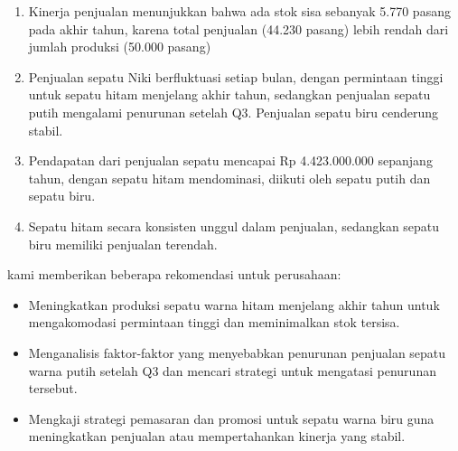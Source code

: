 \documentclass[letterpaper,11pt]{article}
\begin{document}
  \begin{enumerate}
      \item Kinerja penjualan menunjukkan bahwa ada stok sisa sebanyak 5.770 pasang pada akhir tahun, karena total penjualan (44.230 pasang) lebih rendah dari jumlah produksi (50.000 pasang)
      \item Penjualan sepatu Niki berfluktuasi setiap bulan, dengan permintaan tinggi untuk sepatu hitam menjelang akhir tahun, sedangkan penjualan sepatu putih mengalami penurunan setelah Q3. Penjualan sepatu biru cenderung stabil.
      \item Pendapatan dari penjualan sepatu mencapai Rp 4.423.000.000 sepanjang tahun, dengan sepatu hitam mendominasi, diikuti oleh sepatu putih dan sepatu biru.
      \item Sepatu hitam secara konsisten unggul dalam penjualan, sedangkan sepatu biru memiliki penjualan terendah.
  \end{enumerate}
  
  kami memberikan beberapa rekomendasi untuk perusahaan:
  \begin{itemize}
      \item Meningkatkan produksi sepatu warna hitam menjelang akhir tahun untuk mengakomodasi permintaan tinggi dan meminimalkan stok tersisa.
      \item Menganalisis faktor-faktor yang menyebabkan penurunan penjualan sepatu warna putih setelah Q3 dan mencari strategi untuk mengatasi penurunan tersebut.
      \item Mengkaji strategi pemasaran dan promosi untuk sepatu warna biru guna meningkatkan penjualan atau mempertahankan kinerja yang stabil.
  \end{itemize}
\end{document}
